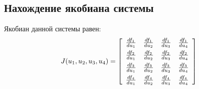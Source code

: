\documentclass[12pt]{article}
\theoremstyle{rusdef}
\begin{document}
	\subsection{Нахождение якобиана системы}
	
	Якобиан данной системы равен:
	\begin{gather}
	J(u_1, u_2, u_3, u_4) = \left[
	\begin{array}{cccc}
	\frac{df_1}{du_1} & \frac{df_1}{du_2} & \frac{df_1}{du_3} & \frac{df_1}{du_4} \\[0.5em]
	\frac{df_2}{du_1} & \frac{df_2}{du_2} & \frac{df_2}{du_3} & \frac{df_2}{du_4} \\[0.5em]
	\frac{df_3}{du_1} & \frac{df_3}{du_2} & \frac{df_3}{du_3} & \frac{df_3}{du_4} \\[0.5em]
	\frac{df_4}{du_1} & \frac{df_4}{du_2} & \frac{df_4}{du_3} & \frac{df_4}{du_4}
	\end{array} \right] \notag

\end{gather}
\end{document}
